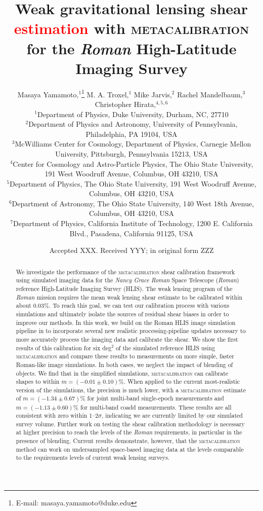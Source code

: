 \documentclass[fleqn,usenatbib]{mnras}
\title[Metacalibration for the Roman High-Latitude Imaging Survey]{Weak gravitational lensing shear \textcolor{red}{estimation} with \textsc{metacalibration} for the \emph{Roman} High-Latitude Imaging Survey}
\author[M. Yamamoto et al.]{
Masaya Yamamoto,$^{1}$\thanks{E-mail: masaya.yamamoto@duke.edu}
M. A. Troxel,$^{1}$
Mike Jarvis,$^{2}$
Rachel Mandelbaum,$^{3}$
Christopher Hirata,$^{4,5,6}$
\newauthor{
Ami Choi,$^{7}$
Tianqing Zhang,$^{3}$}\\
$^{1}$Department of Physics, Duke University, Durham, NC, 27710\\
$^{2}$Department of Physics and Astronomy, University of Pennsylvania, Philadelphia, PA 19104, USA\\
$^{3}$McWilliams Center for Cosmology, Department of Physics, Carnegie Mellon University, Pittsburgh, Pennsylvania 15213, USA\\
$^{4}$Center for Cosmology and Astro-Particle Physics, The Ohio State University, 191 West Woodruff Avenue, Columbus, OH 43210, USA\\
$^{5}$Department of Physics, The Ohio State University, 191 West Woodruff Avenue, Columbus, OH 43210, USA\\
$^{6}$Department of Astronomy, The Ohio State University, 140 West 18th Avenue, Columbus, OH 43210, USA\\
$^{7}$Department of Physics, California Institute of Technology, 1200 E. California Blvd., Pasadena, California 91125, USA\\
}
\date{Accepted XXX. Received YYY; in original form ZZZ}
\begin{document}
\label{firstpage}
\pagerange{\pageref{firstpage}--\pageref{lastpage}}
\maketitle

\begin{abstract}
We investigate the performance of the \textsc{metacalibration} shear calibration framework using simulated imaging data for the \emph{Nancy Grace Roman} Space Telescope (\emph{Roman}) reference High-Latitude Imaging Survey (HLIS). 
The weak lensing program of the \emph{Roman} mission requires the mean weak lensing shear estimate to be calibrated within about 0.03\%. To reach this goal, we can test our calibration process with various simulations and ultimately isolate the sources of residual shear biases in order to improve our methods. In this work, we build on the Roman HLIS image simulation pipeline in \cite{2021MNRAS.501.2044T} to incorporate several new realistic processing-pipeline updates necessary to more accurately process the imaging data and calibrate the shear. We show the first results of this calibration for six \textrm{deg}$^{2}$ of the simulated reference HLIS using \textsc{metacalibration} and compare these results to measurements on more simple, faster Roman-like image simulations. In both cases, we neglect the impact of blending of objects. We find that in the simplified simulations, \textsc{metacalibration} can calibrate shapes to within $m=(-0.01\pm 0.10)$\%. When applied to the current most-realistic version of the simulations, the precision is much lower, with a \textsc{metacalibration} estimate of $m=(-1.34\pm 0.67)$\% for joint multi-band single-epoch measurements and $m=(-1.13\pm 0.60)$\% for multi-band coadd measurements. These results are all consistent with zero within 1--2$\sigma$, indicating we are currently limited by our simulated survey volume. Further work on testing the shear calibration methodology is necessary at higher precision to reach the levels of the \textit{Roman} requirements, in particular in the presence of blending. 
Current results demonstrate, however, that the \textsc{metacalibration} method can work on undersampled space-based imaging data at the levels comparable to the requirements levels of current weak lensing surveys.
\end{abstract}
\end{document}
